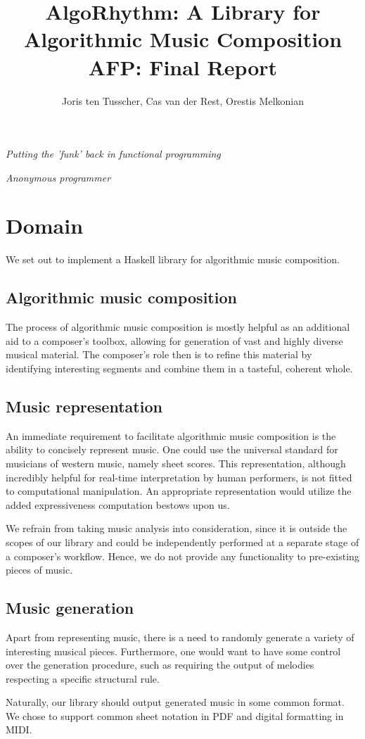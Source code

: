 \documentclass[11pt,a4paper]{article}
\title{\textbf{\Large{AlgoRhythm: A Library for Algorithmic Music Composition} \\ \small{AFP: Final Report}}}
\author{\small{Joris ten Tusscher, Cas van der Rest, Orestis Melkonian}}
\date{}
\begin{document}
\maketitle
\epigraph{\textit{Putting the 'funk' back in functional programming}}{\textit{Anonymous programmer}}
 
\section{Domain}
We set out to implement a Haskell library for algorithmic music composition.
\subsection{Algorithmic music composition}
The process of algorithmic music composition is mostly helpful as an additional aid to a composer's toolbox, allowing for generation of vast and highly diverse musical material. The composer's role then is to refine this material by identifying interesting segments and combine them in a tasteful, coherent whole.
\subsection{Music representation}
An immediate requirement to facilitate algorithmic music composition is the ability to concisely represent music. One could use the universal standard for musicians of western music, namely sheet scores. This representation, although incredibly helpful for real-time interpretation by human performers, is not fitted to computational manipulation. An appropriate representation would utilize the added expressiveness computation bestows upon us.

We refrain from taking music analysis into consideration, since it is outside the scopes of our library and could be independently performed at a separate stage of a composer's workflow. Hence, we do not provide any functionality  to pre-existing pieces of music.

\subsection{Music generation}
Apart from representing music, there is a need to randomly generate a variety of interesting musical pieces. Furthermore, one would want to have some control over the generation procedure, such as requiring the output of melodies respecting a specific structural rule.

Naturally, our library should output generated music in some common format. We chose to support common sheet notation in PDF and digital formatting in MIDI.
\end{document}
